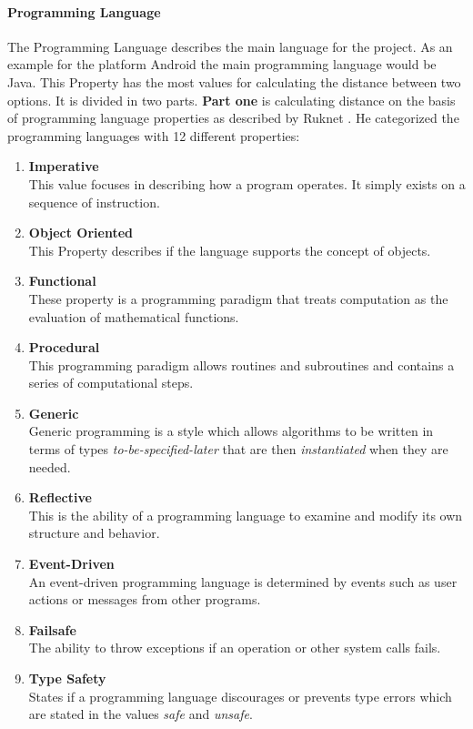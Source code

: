\paragraph*{\textbf{Programming Language}}\label{section:ProgrammingLanguage}
The Programming Language describes the main language for the project. As an example for the platform Android the main programming language would be Java. This Property has the most values for calculating the distance between two options. It is divided in two parts. \textbf{Part one} is calculating distance on the basis of programming language properties as described by Ruknet \cite{ruknet}. He categorized the programming languages with 12 different properties:
\begin{enumerate}
	\item \textbf{Imperative}\\ This value focuses in describing how a program operates. It simply exists on a sequence of instruction.
	\item \textbf{Object Oriented}\\ This Property describes if the language supports the concept of objects.
	\item \textbf{Functional}\\ These property is a programming paradigm that treats computation as the evaluation of mathematical functions. 
	\item \textbf{Procedural}\\ This programming paradigm allows routines and subroutines and contains a series of computational steps.
	\item \textbf{Generic}\\ Generic programming is a style which allows algorithms to be written in terms of types \textit{to-be-specified-later} that are then \textit{instantiated} when they are needed.
	\item \textbf{Reflective}\\ This is the ability of a programming language to examine and modify its own structure and behavior.
	\item \textbf{Event-Driven}\\ An event-driven programming language is determined by events such as user actions or messages from other programs.
	\item \textbf{Failsafe}\\ The ability to throw exceptions if an operation or other system calls fails.
	\item \textbf{Type Safety}\\States if a programming language discourages or prevents type errors which are stated in the values \textit{safe} and \textit{unsafe}.

\end{enumerate}
